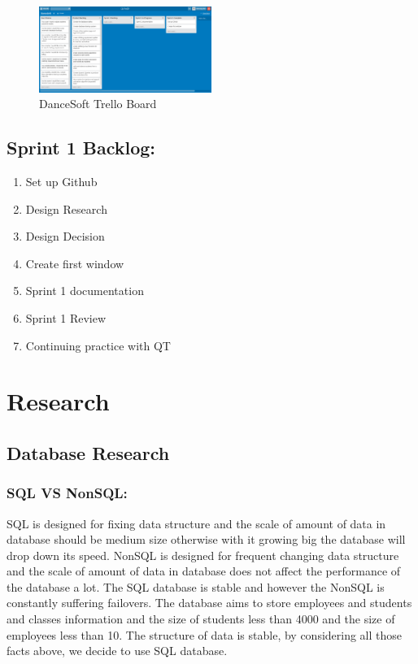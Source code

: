 \documentclass[11pt]{book}
\begin{document}
\begin{figure}
\caption{DanceSoft Trello Board}
\centering
\includegraphics[width=0.5\textwidth]{d1}
\end{figure}



\subsection{Sprint 1 Backlog:}

\begin{enumerate}
\item Set up Github
\item Design Research
\item Design Decision
\item Create first window
\item Sprint 1 documentation
\item Sprint 1 Review
\item Continuing practice with QT

\end{enumerate}

\section{Research}

\subsection{Database Research}

\subsubsection{SQL VS NonSQL:}
SQL is designed for fixing data structure and the scale of amount of data in database should be medium size otherwise with it growing big the database will drop down its speed. NonSQL is designed for frequent changing data structure and the scale of amount of data in database does not affect the performance of the database a lot. The SQL database is stable and however the NonSQL is constantly suffering failovers. The database aims to store employees and students and classes information and the size of students less than 4000 and the size of employees less than 10. The structure of data is stable, by considering all those facts above, we decide to use SQL database.\\
\end{document}
